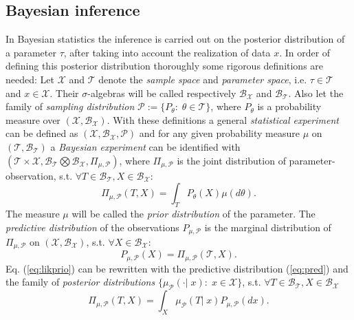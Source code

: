 \documentclass[12pt,letterpaper]{article}
\numberwithin{equation}{subsection}
\begin{document}
\subsection{Bayesian inference}
\label{sec:BayInf}
In Bayesian statistics the inference is carried out on the posterior distribution of a parameter $\tau$, after taking into account the realization of data $x$. In order of defining this posterior distribution thoroughly some rigorous definitions are needed:
Let $\mathcal{X}$ and $\mathcal{T}$ denote the \textit{sample space} and \textit{parameter space}, i.e. $\tau \in \mathcal{T}$ and $x \in \mathcal{X}$. Their $\sigma$-algebras will be called respectively $\mathcal{B}_\mathcal{X}$ and $\mathcal{B}_\mathcal{T}$. Also let the family of \textit{sampling distribution} $\mathcal{P} := \{P_\theta :\;\theta \in \mathcal{T}\}$, where $P_\theta$ is a probability measure over $(\mathcal{X}, \mathcal{B}_\mathcal{X})$. With these definitions a general \textit{statistical experiment} can be defined as $(\mathcal{X}, \mathcal{B}_\mathcal{X}, \mathcal{P})$ and for any given probability measure $\mu$ on $(\mathcal{T}, \mathcal{B}_\mathcal{T})$ a \textit{Bayesian experiment} can be identified with $(\mathcal{T}\times\mathcal{X},  \mathcal{B}_\mathcal{T}\bigotimes\mathcal{B}_\mathcal{X}, \Pi_{\mu,\mathcal{P}})$, where $\Pi_{\mu,\mathcal{P}}$ is the joint distribution of parameter-observation, s.t. $\forall T \in \mathcal{B}_\mathcal{T}, X \in \mathcal{B}_\mathcal{X}$:
\begin{equation}
\label{eq:likprio}
\Pi_{\mu,\mathcal{P}}(T,X) = \int_T P_\theta(X)\mu(d\theta ). 
\end{equation} 
The measure $\mu$ will be called the \textit{prior distribution} of the parameter. The \textit{predictive distribution} of the observations $P_{\mu,\mathcal{P}}$ is the marginal distribution of $\Pi_{\mu,\mathcal{P}}$ on $(\mathcal{X}, \mathcal{B}_\mathcal{X})$, s.t. $\forall X \in \mathcal{B}_\mathcal{X}: $
\begin{equation}
P_{\mu,\mathcal{P}}(X) = \Pi_{\mu,\mathcal{P}}(\mathcal{T},X).
\label{eq:pred}
\end{equation}
Eq. (\ref{eq:likprio}) can be rewritten with the predictive distribution (\ref{eq:pred}) and the family of \textit{posterior distributions} $\{\mu_\mathcal{P}(\cdot |\; x):\; x\in\mathcal{X}\}$, s.t. $\forall T \in \mathcal{B}_\mathcal{T}, X \in \mathcal{B}_\mathcal{X}$
\begin{equation}
\label{eq:post}
\Pi_{\mu,\mathcal{P}}(T,X) = \int_X \mu_\mathcal{P}(T|\; x) P_{\mu,\mathcal{P}}(dx ). 
\end{equation} 
\end{document}
